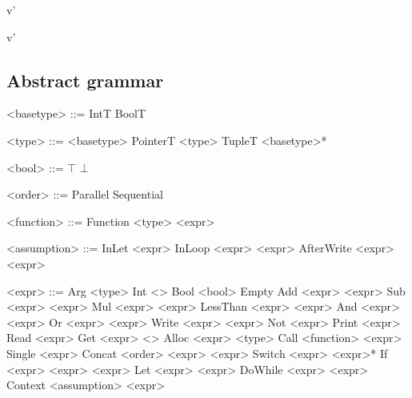 {\easvsd
  {}{\targ}{\tmem}
  {v}{\tmem'}}

{\easvsd
  {}{\targ}{\tmem}
  {v}{\tmem'}}

\newpage
\subsection*{Abstract grammar}
\begin{minipage}[t]{0.45\linewidth}
  \begin{grammar}
    <basetype> ::= IntT \alt BoolT

    <type> ::= <basetype> \alt PointerT <type> \alt TupleT <basetype>*

    <bool> ::= $\top$ \alt $\bot$

    <order> ::= Parallel \alt Sequential

    <function> ::= Function <type> <expr>

    <assumption> ::= InLet <expr>
    \alt InLoop <expr> <expr>
    \alt AfterWrite <expr> <expr>
  \end{grammar}
\end{minipage}\hfill%
\begin{minipage}[t]{0.5\linewidth}
  \begin{grammar}
    <expr> ::= Arg <type>
    \alt Int <\N>
    \alt Bool <bool>
    \alt Empty
    \alt Add <expr> <expr>
    \alt Sub <expr> <expr>
    \alt Mul <expr> <expr>
    \alt LessThan <expr> <expr>
    \alt And <expr> <expr>
    \alt Or <expr> <expr>
    \alt Write <expr> <expr>
    \alt Not <expr>
    \alt Print <expr>
    \alt Read <expr>
    \alt Get <expr> <\N>
    \alt Alloc <expr> <type>
    \alt Call <function> <expr>
    \alt Single <expr>
    \alt Concat <order> <expr> <expr>
    \alt Switch <expr> <expr>*
    \alt If <expr> <expr> <expr>
    \alt Let <expr> <expr>
    \alt DoWhile <expr> <expr>
    \alt Context <assumption> <expr>
  \end{grammar}%
\end{minipage}%


